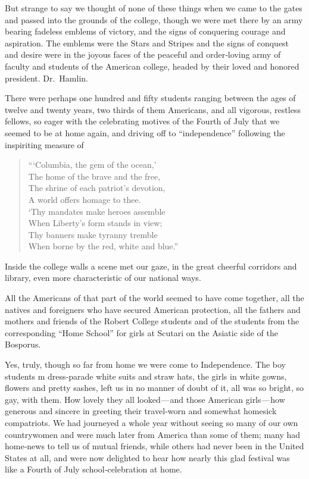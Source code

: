 \documentclass[12pt]{book}
\begin{document}
But strange to say we thought of none of these things when we came to the
gates and passed into the grounds of the college, though we were met there by an
army bearing fadeless emblems of victory, and the signs of conquering courage
and aspiration. The emblems were the Stars and Stripes and the signs of conquest
and desire were in the joyous faces of the peaceful and order‐loving army of
faculty and students of the American college, headed by their loved and honored
president. Dr.~Hamlin.

There were perhaps one hundred and fifty students ranging between the ages
of twelve and twenty years, two thirds of them Americans, and all vigorous,
restless fellows, so eager with the celebrating motives of the Fourth of July that
we seemed to be at home again, and driving off to “independence” following the
inspiriting measure of
\begin{quote}
“‘Columbia, the gem of the ocean,’ \\
The home of the brave and the free, \\
The shrine of each patriot’s devotion, \\
A world offers homage to thee. \\
‘Thy mandates make heroes assemble \\
When Liberty’s form stands in view; \\
Thy banners make tyranny tremble \\
When borne by the red, white and blue.”
\end{quote}

Inside the college walls a scene met our gaze, in the great cheerful corridors
and library, even more characteristic of our national ways.

All the Americans of that part of the world seemed to have come together, all
the natives and foreigners who have secured American protection, all the fathers
and mothers and friends of the Robert College students and of the students from
the corresponding “Home School” for girls at Scutari on the Asiatic side of the
Bosporus.

Yes, truly, though so far from home we were come to Independence. The boy
students m dress‐parade white suits and straw hats, the girls in white gowns,
flowers and pretty sashes, left us in no manner of doubt of it, all was so bright,
so gay, with them. How lovely they all looked — and those American girls — how
generous and sincere in greeting their travel‐worn and somewhat homesick
compatriots. We had journeyed a whole year without seeing so many of our own
countrywomen and were much later from America than some of them; many had
home‐news to tell us of mutual friends, while others had never been in the United
States at all, and were now delighted to hear how nearly this glad festival was
like a Fourth of July school‐celebration at home.
\end{document}
